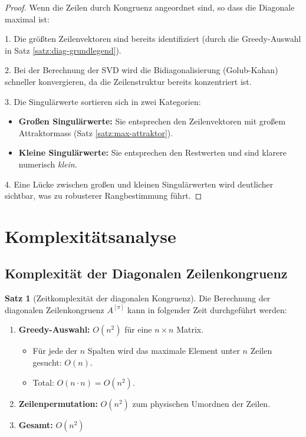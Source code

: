\documentclass[a4paper,12pt]{article}
\theoremstyle{definition}
\newtheorem{satz}{Satz}
\begin{document}
\begin{proof}
	Wenn die Zeilen durch Kongruenz angeordnet sind, so dass die Diagonale maximal ist:
	
	1. Die größten Zeilenvektoren sind bereits identifiziert (durch die Greedy-Auswahl in Satz \ref{satz:diag-grundlegend}).
	
	2. Bei der Berechnung der SVD wird die Bidiagonalisierung (Golub-Kahan) schneller konvergieren, da die Zeilenstruktur bereits konzentriert ist.
	
	3. Die Singulärwerte sortieren sich in zwei Kategorien:
	\begin{itemize}
		\item \textbf{Großen Singulärwerte:} Sie entsprechen den Zeilenvektoren mit großem Attraktormass (Satz \ref{satz:max-attraktor}).
		\item \textbf{Kleine Singulärwerte:} Sie entsprechen den Restwerten und sind klarere numerisch \emph{klein}.
	\end{itemize}
	
	4. Eine Lücke zwischen großen und kleinen Singulärwerten wird deutlicher sichtbar, was zu robusterer Rangbestimmung führt.
\end{proof}

\section{Komplexitätsanalyse}

\subsection{Komplexität der Diagonalen Zeilenkongruenz}

\begin{satz}[Zeitkomplexität der diagonalen Kongruenz]
	\label{satz:komplexitaet}
	Die Berechnung der diagonalen Zeilenkongruenz $A^{[\pi]}$ kann in folgender Zeit durchgeführt werden:
	\begin{enumerate}
		\item \textbf{Greedy-Auswahl:} $O(n^2)$ für eine $n \times n$ Matrix.
		\begin{itemize}
			\item Für jede der $n$ Spalten wird das maximale Element unter $n$ Zeilen gesucht: $O(n)$.
			\item Total: $O(n \cdot n) = O(n^2)$.
		\end{itemize}
		\item \textbf{Zeilenpermutation:} $O(n^2)$ zum physischen Umordnen der Zeilen.
		\item \textbf{Gesamt:} $O(n^2)$
	\end{enumerate}
\end{satz}
\end{document}
